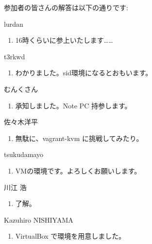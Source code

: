 \documentclass[mingoth,a4paper]{jsarticle}
\begin{document}
参加者の皆さんの解答は以下の通りです:

\begin{prework}{ lurdan }
  \begin{enumerate}
  \item 16時くらいに参上いたします……
  \end{enumerate}
\end{prework}

\begin{prework}{ t3rkwd }
  \begin{enumerate}
  \item わかりました。sid環境になるとおもいます。
  \end{enumerate}
\end{prework}

\begin{prework}{ むんくさん }
  \begin{enumerate}
  \item 承知しました。Note PC 持参します。
  \end{enumerate}
\end{prework}

\begin{prework}{ 佐々木洋平 }
  \begin{enumerate}
  \item 無駄に、vagrant-kvm に挑戦してみたり。
  \end{enumerate}
\end{prework}

\begin{prework}{ tsukudamayo }
  \begin{enumerate}
  \item VMの環境です。よろしくお願いします。
  \end{enumerate}
\end{prework}

\begin{prework}{ 川江 浩 }
  \begin{enumerate}
  \item 了解。
  \end{enumerate}
\end{prework}

\begin{prework}{ Kazuhiro NISHIYAMA }
  \begin{enumerate}
  \item VirtualBox で環境を用意しました。
  \end{enumerate}
\end{prework}
\end{document}
